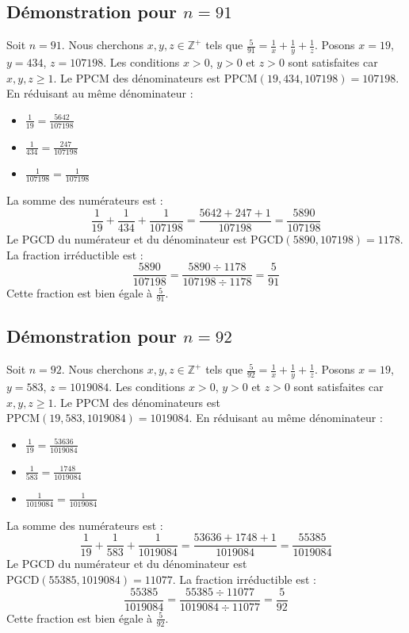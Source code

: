 \documentclass[11pt,a4paper]{article}
\begin{document}
\subsection{Démonstration pour $n = 91$}
Soit $n = 91$. Nous cherchons $x, y, z \in \mathbb{Z}^{+}$ tels que $\frac{5}{91} = \frac{1}{x} + \frac{1}{y} + \frac{1}{z}$.
Posons $x = 19$, $y = 434$, $z = 107198$.
Les conditions $x > 0$, $y > 0$ et $z > 0$ sont satisfaites car $x, y, z \geq 1$.
Le PPCM des dénominateurs est $\text{PPCM}(19, 434, 107198) = 107198$.
En réduisant au même dénominateur :
\begin{itemize}
    \item $\frac{1}{19} = \frac{5642}{107198}$
    \item $\frac{1}{434} = \frac{247}{107198}$
    \item $\frac{1}{107198} = \frac{1}{107198}$
\end{itemize}
La somme des numérateurs est :
$$ \frac{1}{19} + \frac{1}{434} + \frac{1}{107198} = \frac{5642 + 247 + 1}{107198} = \frac{5890}{107198} $$
Le PGCD du numérateur et du dénominateur est $\text{PGCD}(5890, 107198) = 1178$.
La fraction irréductible est :
$$ \frac{5890}{107198} = \frac{5890 \div 1178}{107198 \div 1178} = \frac{5}{91} $$
Cette fraction est bien égale à $\frac{5}{91}$.

\subsection{Démonstration pour $n = 92$}
Soit $n = 92$. Nous cherchons $x, y, z \in \mathbb{Z}^{+}$ tels que $\frac{5}{92} = \frac{1}{x} + \frac{1}{y} + \frac{1}{z}$.
Posons $x = 19$, $y = 583$, $z = 1019084$.
Les conditions $x > 0$, $y > 0$ et $z > 0$ sont satisfaites car $x, y, z \geq 1$.
Le PPCM des dénominateurs est $\text{PPCM}(19, 583, 1019084) = 1019084$.
En réduisant au même dénominateur :
\begin{itemize}
    \item $\frac{1}{19} = \frac{53636}{1019084}$
    \item $\frac{1}{583} = \frac{1748}{1019084}$
    \item $\frac{1}{1019084} = \frac{1}{1019084}$
\end{itemize}
La somme des numérateurs est :
$$ \frac{1}{19} + \frac{1}{583} + \frac{1}{1019084} = \frac{53636 + 1748 + 1}{1019084} = \frac{55385}{1019084} $$
Le PGCD du numérateur et du dénominateur est $\text{PGCD}(55385, 1019084) = 11077$.
La fraction irréductible est :
$$ \frac{55385}{1019084} = \frac{55385 \div 11077}{1019084 \div 11077} = \frac{5}{92} $$
Cette fraction est bien égale à $\frac{5}{92}$.
\end{document}
